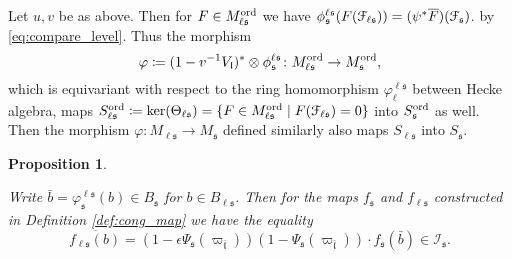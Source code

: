 \documentclass[leqno]{amsart}
\newtheorem{prop}[thm]{Proposition}
\theoremstyle{definition}
\theoremstyle{remark}
\newcommand{\fl}{\mathfrak{l}}
\newcommand{\fs}{\mathfrak{s}}
\newcommand{\euF}{\EuScript{F}} %
\newcommand{\I}{\mathcal{I}} %
\newcommand{\ord}{\textnormal{ord}} %
\begin{document}
Let $u, v$ be as above. 
Then for $F\in M_{\ell\fs}^{\ord}$ we have
$\phi^{\ell\fs}_\fs(F(\euF_{\ell\fs}))=(\psi^*\overline{F})(\euF_\fs)$.
by \eqref{eq:compare_level}. Thus the morphism
\[
    \varphi\coloneqq (1-v^{-1}V_\fl)^*\otimes \phi^{\ell\fs}_\fs\colon 
    M_{\ell\fs}^{\ord}\to M_\fs^{\ord},
\]
which is equivariant with respect to the ring homomorphism
$\varphi^{\ell\fs}_\ell$ between Hecke algebra,
maps $S_{\ell\fs}^{\ord}\coloneqq\ker(\Theta_{\ell\fs})=
\{F\in M^{\ord}_{\ell\fs}\mid F(\euF_{\ell\fs})=0\}$ into 
$S_{\fs}^{\ord}$ as well. Then the morphism
$\varphi\colon M_{\ell\fs}\to M_\fs$ defined similarly also maps
$S_{\ell\fs}$ into $S_\fs$.






\begin{prop}\label{prop:cores}

Write $\bar{b}=\varphi^{\ell\fs}_{\fs}(b)\in B_\fs$
for $b\in B_{\ell\fs}$.
Then for the maps $f_\fs$ and $f_{\ell\fs}$
constructed in Definition \ref{def:cong_map}
we have the equality
\[
\overline{f_{\ell\fs}(b)}=
(1-\epsilon\Psi_{\fs}(\varpi_{\bar{\fl}}))
(1-\Psi_\fs(\varpi_{\bar{\fl}}))
\cdot f_\fs(\bar{b})\in \I_\fs.
\]
\end{prop}
\end{document}
